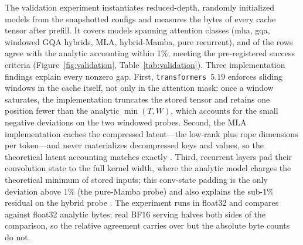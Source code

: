 The validation experiment instantiates reduced-depth, randomly initialized models from the snapshotted configs and measures the bytes of every cache tensor after prefill. It covers \kvcValRows{} models spanning \kvcValClasses{} attention classes (mha, gqa, windowed GQA hybrids, MLA, hybrid-Mamba, pure recurrent), and \kvcValWithin{} of the rows agree with the analytic accounting within 1\%, meeting the pre-registered success criteria (Figure~\ref{fig:validation}, Table~\ref{tab:validation}). Three implementation findings explain every nonzero gap. First, \texttt{transformers}~5.19 enforces sliding windows in the cache itself, not only in the attention mask: once a window saturates, the implementation truncates the stored tensor and retains one position fewer than the analytic $\min(T,W)$, which accounts for the small negative deviations on the two windowed probes. Second, the MLA implementation caches the compressed latent---the low-rank plus rope dimensions per token---and never materializes decompressed keys and values, so the theoretical latent accounting matches exactly \cite{deepseekai2024v2}. Third, recurrent layers pad their convolution state to the full kernel width, where the analytic model charges the theoretical minimum of stored inputs; this conv-state padding is the only deviation above 1\% (the pure-Mamba probe) and also explains the sub-1\% residual on the hybrid probe \cite{gu2023mamba}. The experiment runs in float32 and compares against float32 analytic bytes; real BF16 serving halves both sides of the comparison, so the relative agreement carries over but the absolute byte counts do not.

